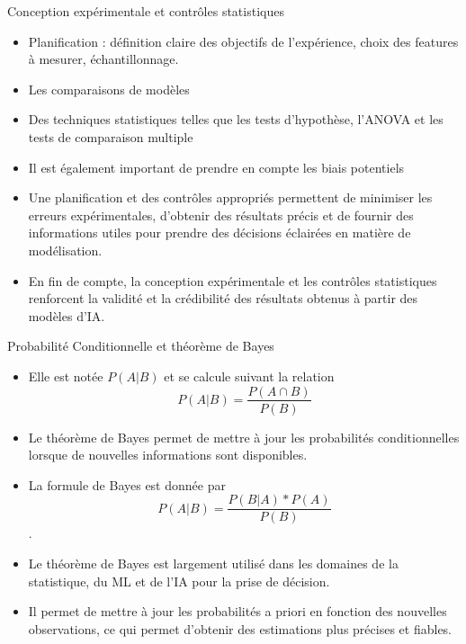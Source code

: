 \documentclass{beamer}
\begin{document}
\begin{frame}{Conception expérimentale et contrôles statistiques}
	\begin{itemize}

		\item Planification : définition claire des objectifs de l'expérience, choix des features à mesurer, échantillonnage.
		\item Les comparaisons de modèles
		\item Des techniques statistiques telles que les tests d'hypothèse, l'ANOVA et les tests de comparaison multiple 
		\item Il est également important de prendre en compte les biais potentiels
		\item Une planification et des contrôles appropriés permettent de minimiser les erreurs expérimentales, d'obtenir des résultats précis et de fournir des informations utiles pour prendre des décisions éclairées en matière de modélisation.
		\item En fin de compte, la conception expérimentale et les contrôles statistiques renforcent la validité et la crédibilité des résultats obtenus à partir des modèles d'IA.
	\end{itemize}
\end{frame}




\begin{frame}{Probabilité Conditionnelle et théorème de Bayes}
	\begin{itemize}
		
		\item Elle est notée $P(A|B)$ et se calcule suivant la relation $$P(A|B) = \frac{P(A\cap B)}{P(B)}$$
		\item Le théorème de Bayes permet de mettre à jour les probabilités conditionnelles lorsque de nouvelles informations sont disponibles.
		\item La formule de Bayes est donnée par  $$P(A|B) = \frac{P(B|A) * P(A)}{P(B)} $$.
		\item Le théorème de Bayes est largement utilisé dans les domaines de la statistique, du ML et de l'IA pour la prise de décision.
		\item Il permet de mettre à jour les probabilités a priori en fonction des nouvelles observations, ce qui permet d'obtenir des estimations plus précises et fiables.

	\end{itemize}
\end{frame}
\end{document}
